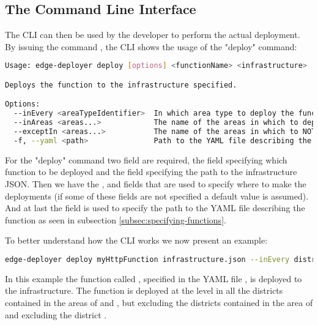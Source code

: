 \subsection{The Command Line Interface}
The CLI can then be used by the developer to perform the actual deployment.
By issuing the command , the CLI shows the usage of the "deploy" command:

\begin{lstlisting}[language=bash]
Usage: edge-deployer deploy [options] <functionName> <infrastructure>

Deploys the function to the infrastructure specified.

Options:
  --inEvery <areaTypeIdentifier>  In which area type to deploy the function. If not specified the function is deployed to the lowest level.
  --inAreas <areas...>            The name of the areas in which to deploy the function. If not specified the function is deployed everywhere.
  --exceptIn <areas...>           The name of the areas in which to NOT deploy the function.
  -f, --yaml <path>               Path to the YAML file describing the function. (default: "stack.yml")
\end{lstlisting}

For the "deploy" command two field are required, the  field specifying which function to be deployed and the  field specifying the path to the infrastructure JSON.
Then we have the ,  and  fields that are used to specify where to make the deployments (if some of these fields are not specified a default value is assumed).
And at last the  field is used to specify the path to the YAML file describing the function as seen in subsection \ref{subsec:specifying-functions}.

To better understand how the CLI works we now present an example:

\begin{lstlisting}[language=bash]
edge-deployer deploy myHttpFunction infrastructure.json --inEvery district --inAreas italy paris --exceptIn milan paris001 --yaml stack.yml
\end{lstlisting}

In this example the function called , specified in the YAML file , is deployed to the infrastructure. The function is deployed at the  level in all the districts contained in the areas of  and , but excluding the districts contained in the area of  and excluding the district .

